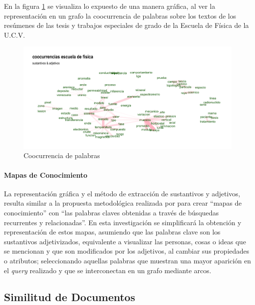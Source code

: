 \documentclass[
  12pt,
  openany]{book}
\begin{document}
En la figura \ref{fig:coocejem} se visualiza lo expuesto de una manera gráfica, al ver la representación en un grafo la coocurrencia de palabras sobre los textos de los resúmenes de las tesis y trabajos especiales de grado de la Escuela de Física de la U.C.V.

\begin{figure}

{\centering \includegraphics[width=0.9\linewidth]{images/03-marco-teorico/cooc} 

}

\caption{Coocurrencia de palabras}\label{fig:coocejem}
\end{figure}

\hypertarget{mapacon}{%
\paragraph{Mapas de Conocimiento}\label{mapacon}}

La representación gráfica y el método de extracción de sustantivos y adjetivos, resulta similar a la propuesta metodológica realizada por \citep{dueñas2011} para crear ``mapas de conocimiento'' con ``las palabras claves obtenidas a través de búsquedas recurrentes y relacionadas''. En esta investigación se simplificará la obtención y representación de estos mapas, asumiendo que las palabras clave son los sustantivos adjetivizados, equivalente a visualizar las personas, cosas o ideas que se mencionan y que son modificados por los adjetivos, al cambiar sus propiedades o atributos; seleccionando aquellas palabras que muestran una mayor aparición en el \emph{query} realizado y que se interconectan en un grafo mediante arcos.

\hypertarget{similitud}{%
\subsection{Similitud de Documentos}\label{similitud}}
\end{document}
